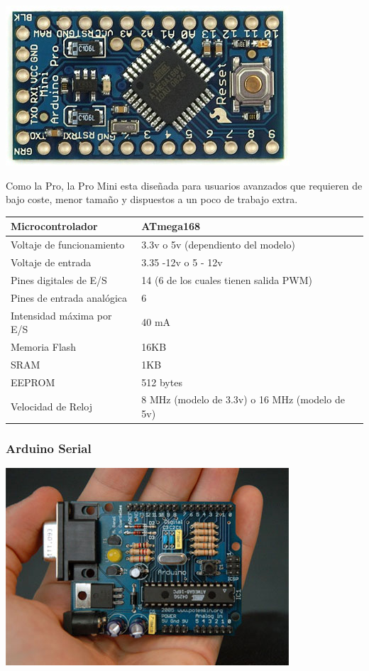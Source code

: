 \documentclass[12pt,a4papert,woside,openright,titlepage,final]{book}
\begin{document}
\includegraphics[scale=0.6]{ArduinoProMini.jpg}

Como la Pro, la Pro Mini esta diseñada para usuarios avanzados que requieren de
bajo coste, menor tamaño y dispuestos a un poco de trabajo extra. 

\begin{tabular}{||l | l ||}
\hline
\hline
Microcontrolador & ATmega168\\
\hline
Voltaje de funcionamiento & 3.3v o 5v (dependiento del modelo)\\
\hline
Voltaje de entrada & 3.35 -12v o 5 - 12v\\
\hline
Pines digitales de E/S & 14 (6 de los cuales tienen salida PWM)\\
\hline
Pines de entrada analógica & 6\\
\hline
Intensidad máxima por E/S & 40 mA\\
\hline
Memoria Flash & 16KB\\
\hline
SRAM & 1KB\\
\hline
EEPROM & 512 bytes\\
\hline
Velocidad de Reloj & 8 MHz (modelo de 3.3v) o 16 MHz (modelo de 5v)\\
\hline
\hline
\end{tabular}

\subsubsection{Arduino Serial}

\includegraphics[scale=0.6]{arduino.jpg}
\end{document}
